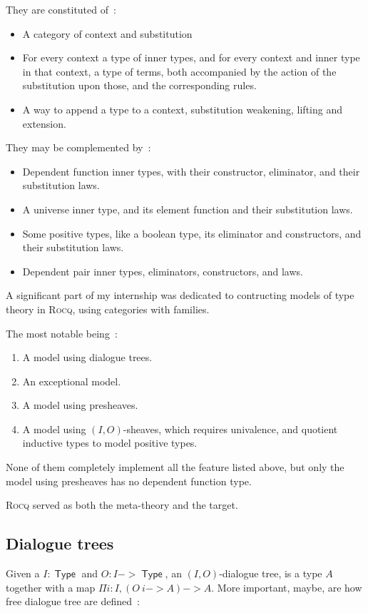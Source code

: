\documentclass[11pt]{article}
\DeclareMathOperator{\Type}{\mathsf{Type}}
\newcommand{\0}{\mathbf{0}}
\newcommand{\1}{\mathbf{1}}
\begin{document}
They are constituted of~:
\begin{itemize}
    \item A category of context and substitution
    \item For every context a type of inner types, and for every context and inner type in that context, a type of terms, both accompanied by the action of the substitution upon those, and the corresponding rules.
    \item A way to append a type to a context, substitution weakening, lifting and extension.
\end{itemize}
They may be complemented by~:
\begin{itemize}
    \item Dependent function inner types, with their constructor, eliminator, and their substitution laws.
    \item A universe inner type, and its element function and their substitution laws.
    \item Some positive types, like a boolean type, its eliminator and constructors, and their substitution laws.
    \item Dependent pair inner types, eliminators, constructors, and laws.
\end{itemize}

A significant part of my internship was dedicated to contructing models of type theory in \textsc{Rocq}, using categories with families.

The most notable being~:
\begin{enumerate}
    \item A model using dialogue trees.
    \item An exceptional model.
    \item A model using presheaves.
    \item A model using $(I,O)$-sheaves, which requires univalence, and quotient inductive types to model positive types.
\end{enumerate}

None of them completely implement all the feature listed above, but only the model using presheaves has no dependent function type.

\textsc{Rocq} served as both the meta-theory and the target.

\subsection{Dialogue trees}

Given a $I : \Type$ and $O : I -> \Type$, an $(I,O)$-dialogue tree, is a type $A$ together with a map $\Pi i : I, (O\ i-> A) -> A$. More important, maybe, are how free dialogue tree are defined~: 
\end{document}
